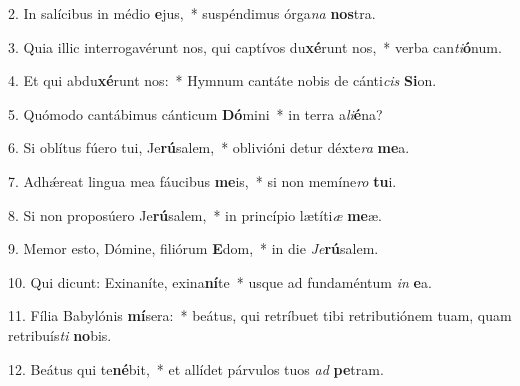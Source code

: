 2. In salícibus in médio \textbf{e}jus,~*  suspéndimus órga\textit{na} \textbf{nos}tra.\

3. Quia illic interrogavérunt nos, qui captívos du\textbf{xé}runt nos,~*  verba can\textit{ti}\textbf{ó}num.\

4. Et qui abdu\textbf{xé}runt nos:~*  Hymnum cantáte nobis de cánti\textit{cis} \textbf{Si}on.\

5. Quómodo cantábimus cánticum \textbf{Dó}mini~*  in terra a\textit{li}\textbf{é}na?\

6. Si oblítus fúero tui, Je\textbf{rú}salem,~*  oblivióni detur déxte\textit{ra} \textbf{me}a.\

7. Adhǽreat lingua mea fáucibus \textbf{me}is,~*  si non memíne\textit{ro} \textbf{tu}i.\

8. Si non proposúero Je\textbf{rú}salem,~*  in princípio lætíti\textit{æ} \textbf{me}æ.\

9. Memor esto, Dómine, filiórum \textbf{E}dom,~*  in die \textit{Je}\textbf{rú}salem.\

10. Qui dicunt: Exinaníte, exina\textbf{ní}te~*  usque ad fundaméntum \textit{in} \textbf{e}a.\

11. Fília Babylónis \textbf{mí}sera:~*  beátus, qui retríbuet tibi retributiónem tuam, quam retribuís\textit{ti} \textbf{no}bis.\

12. Beátus qui te\textbf{né}bit,~*  et allídet párvulos tuos \textit{ad} \textbf{pe}tram.\

